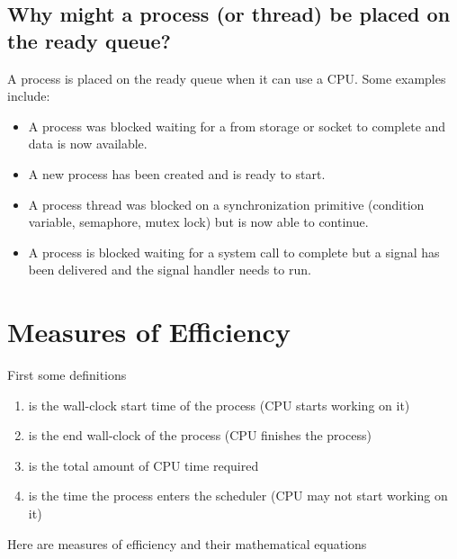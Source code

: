 \subsection{Why might a process (or thread) be placed on the ready queue?}

A process is placed on the ready queue when it can use a CPU. Some examples include:

\begin{itemize}
  \tightlist
\item A process was blocked waiting for a  from storage or socket to complete and data is now available.
\item A new process has been created and is ready to start.
\item A process thread was blocked on a synchronization primitive (condition variable, semaphore, mutex lock) but is now able to continue.
\item A process is blocked waiting for a system call to complete but a signal has been delivered and the signal handler needs to run.
\end{itemize}

\section{Measures of Efficiency}

First some definitions

\begin{enumerate}
  \item {} is the wall-clock start time of the process (CPU starts working on it)
  \item {} is the end wall-clock of the process (CPU finishes the process)
  \item {} is the total amount of CPU time required
  \item {} is the time the process enters the scheduler (CPU may not start working on it)
\end{enumerate}

Here are measures of efficiency and their mathematical equations

